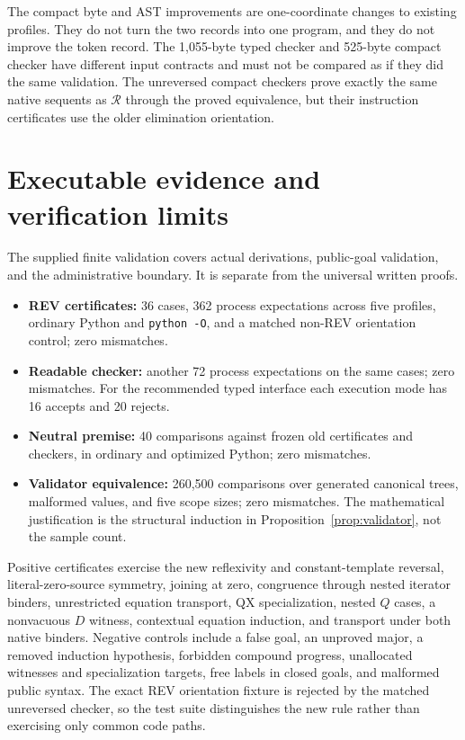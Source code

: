 \documentclass[11pt,letterpaper]{article}
\theoremstyle{definition}\newtheorem{definition}[theorem]{Definition}
\theoremstyle{remark}\newtheorem{remark}[theorem]{Remark}
\newcommand{\Rcal}{\mathcal R}
\begin{document}
The compact byte and AST improvements are one-coordinate changes to
existing profiles. They do not turn the two records into one program,
and they do not improve the token record. The 1,055-byte typed checker
and 525-byte compact checker have different input contracts and must
not be compared as if they did the same validation. The unreversed
compact checkers prove exactly the same native sequents as $\Rcal$
through the proved equivalence, but their instruction certificates use
the older elimination orientation.

\section{Executable evidence and verification limits}
\label{sec:validation}

The supplied finite validation covers actual derivations, public-goal
validation, and the administrative boundary. It is separate from the
universal written proofs.
\begin{itemize}
\item \textbf{REV certificates:} 36 cases, 362 process expectations across
  five profiles, ordinary Python and \texttt{python -O}, and a matched
  non-REV orientation control; zero mismatches.
\item \textbf{Readable checker:} another 72 process expectations on the
  same cases; zero mismatches. For the recommended typed interface each
  execution mode has 16 accepts and 20 rejects.
\item \textbf{Neutral premise:} 40 comparisons against frozen old
  certificates and checkers, in ordinary and optimized Python; zero
  mismatches.
\item \textbf{Validator equivalence:} 260,500 comparisons over generated
  canonical trees, malformed values, and five scope sizes; zero
  mismatches. The mathematical justification is the structural induction
  in Proposition~\ref{prop:validator}, not the sample count.
\end{itemize}

Positive certificates exercise the new reflexivity and constant-template
reversal, literal-zero-source symmetry, joining at zero, congruence
through nested iterator binders, unrestricted equation transport, QX
specialization, nested $Q$ cases, a nonvacuous $D$ witness, contextual
equation induction, and transport under both native binders. Negative
controls include a false goal, an unproved major, a removed induction
hypothesis, forbidden compound progress, unallocated witnesses and
specialization targets, free labels in closed goals, and malformed
public syntax. The exact REV orientation fixture is rejected by the
matched unreversed checker, so the test suite distinguishes the new
rule rather than exercising only common code paths.
\end{document}

